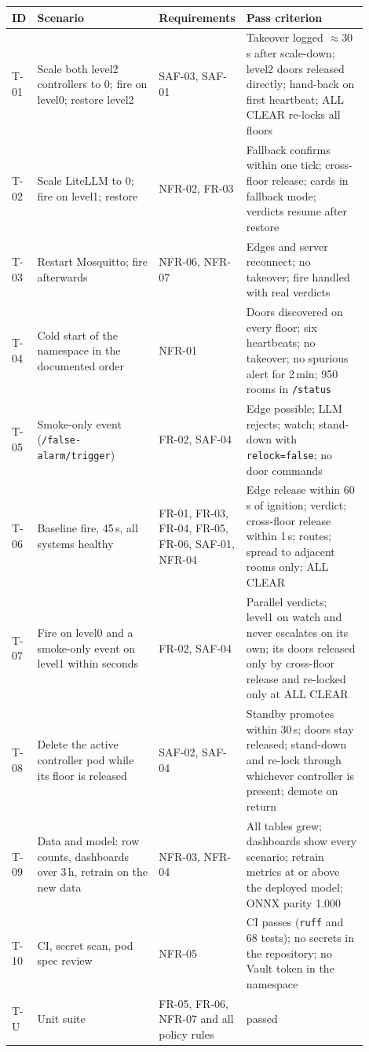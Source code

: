 \documentclass[11pt]{article}
\begin{document}
\begin{longtable}[]{@{}
  >{\raggedright\arraybackslash}p{0.06\linewidth}
  >{\raggedright\arraybackslash}p{0.34\linewidth}
  >{\raggedright\arraybackslash}p{0.16\linewidth}
  >{\raggedright\arraybackslash}p{0.34\linewidth}@{}}
\toprule
\textbf{ID} & \textbf{Scenario} & \textbf{Requirements} & \textbf{Pass criterion} \\
\midrule
\endhead
T-01 & Scale both level2 controllers to 0; fire on level0; restore level2 & SAF-03, SAF-01 & Takeover logged $\approx$30\,s after scale-down; level2 doors released directly; hand-back on first heartbeat; ALL CLEAR re-locks all floors \\
T-02 & Scale LiteLLM to 0; fire on level1; restore & NFR-02, FR-03 & Fallback confirms within one tick; cross-floor release; cards in fallback mode; verdicts resume after restore \\
T-03 & Restart Mosquitto; fire afterwards & NFR-06, NFR-07 & Edges and server reconnect; no takeover; fire handled with real verdicts \\
T-04 & Cold start of the namespace in the documented order & NFR-01 & Doors discovered on every floor; six heartbeats; no takeover; no spurious alert for 2\,min; 950 rooms in \texttt{/status} \\
T-05 & Smoke-only event (\texttt{/false-alarm/trigger}) & FR-02, SAF-04 & Edge possible; LLM rejects; watch; stand-down with \texttt{relock=false}; no door commands \\
T-06 & Baseline fire, 45\,s, all systems healthy & FR-01, FR-03, FR-04, FR-05, FR-06, SAF-01, NFR-04 & Edge release within 60\,s of ignition; verdict; cross-floor release within 1\,s; routes; spread to adjacent rooms only; ALL CLEAR \\
T-07 & Fire on level0 and a smoke-only event on level1 within seconds & FR-02, SAF-04 & Parallel verdicts; level1 on watch and never escalates on its own; its doors released only by cross-floor release and re-locked only at ALL CLEAR \\
T-08 & Delete the active controller pod while its floor is released & SAF-02, SAF-04 & Standby promotes within 30\,s; doors stay released; stand-down and re-lock through whichever controller is present; demote on return \\
T-09 & Data and model: row counts, dashboards over 3\,h, retrain on the new data & NFR-03, NFR-04 & All tables grew; dashboards show every scenario; retrain metrics at or above the deployed model; ONNX parity 1.000 \\
T-10 & CI, secret scan, pod spec review & NFR-05 & CI passes (\texttt{ruff} and 68 tests); no secrets in the repository; no Vault token in the namespace \\
T-U & Unit suite & FR-05, FR-06, NFR-07 and all policy rules & 68 passed \\
\bottomrule
\end{longtable}
\end{document}
